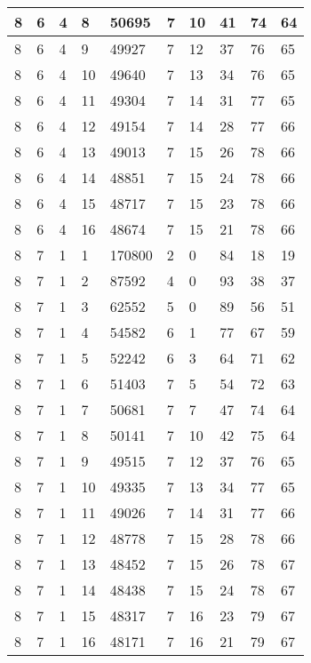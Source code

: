 \begin{table}[!ht]
\begin{tabular}{|l|l|l|l|l|l|l|l|l|l|}
        8 & 6 & 4 & 8 & 50695 & 7 & 10 & 41 & 74 & 64 \\ \hline
        8 & 6 & 4 & 9 & 49927 & 7 & 12 & 37 & 76 & 65 \\ \hline
        8 & 6 & 4 & 10 & 49640 & 7 & 13 & 34 & 76 & 65 \\ \hline
        8 & 6 & 4 & 11 & 49304 & 7 & 14 & 31 & 77 & 65 \\ \hline
        8 & 6 & 4 & 12 & 49154 & 7 & 14 & 28 & 77 & 66 \\ \hline
        8 & 6 & 4 & 13 & 49013 & 7 & 15 & 26 & 78 & 66 \\ \hline
        8 & 6 & 4 & 14 & 48851 & 7 & 15 & 24 & 78 & 66 \\ \hline
        8 & 6 & 4 & 15 & 48717 & 7 & 15 & 23 & 78 & 66 \\ \hline
        8 & 6 & 4 & 16 & 48674 & 7 & 15 & 21 & 78 & 66 \\ \hline
        8 & 7 & 1 & 1 & 170800 & 2 & 0 & 84 & 18 & 19 \\ \hline
        8 & 7 & 1 & 2 & 87592 & 4 & 0 & 93 & 38 & 37 \\ \hline
        8 & 7 & 1 & 3 & 62552 & 5 & 0 & 89 & 56 & 51 \\ \hline
        8 & 7 & 1 & 4 & 54582 & 6 & 1 & 77 & 67 & 59 \\ \hline
        8 & 7 & 1 & 5 & 52242 & 6 & 3 & 64 & 71 & 62 \\ \hline
        8 & 7 & 1 & 6 & 51403 & 7 & 5 & 54 & 72 & 63 \\ \hline
        8 & 7 & 1 & 7 & 50681 & 7 & 7 & 47 & 74 & 64 \\ \hline
        8 & 7 & 1 & 8 & 50141 & 7 & 10 & 42 & 75 & 64 \\ \hline
        8 & 7 & 1 & 9 & 49515 & 7 & 12 & 37 & 76 & 65 \\ \hline
        8 & 7 & 1 & 10 & 49335 & 7 & 13 & 34 & 77 & 65 \\ \hline
        8 & 7 & 1 & 11 & 49026 & 7 & 14 & 31 & 77 & 66 \\ \hline
        8 & 7 & 1 & 12 & 48778 & 7 & 15 & 28 & 78 & 66 \\ \hline
        8 & 7 & 1 & 13 & 48452 & 7 & 15 & 26 & 78 & 67 \\ \hline
        8 & 7 & 1 & 14 & 48438 & 7 & 15 & 24 & 78 & 67 \\ \hline
        8 & 7 & 1 & 15 & 48317 & 7 & 16 & 23 & 79 & 67 \\ \hline
        8 & 7 & 1 & 16 & 48171 & 7 & 16 & 21 & 79 & 67 \\ \hline

\end{tabular}
\end{table}

